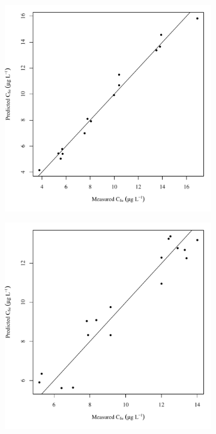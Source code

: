 \begin{linenumbers}
\subfiguretop
\begin{landscape}
	\begin{figure}
		\begin{subfigure}{0.7\textwidth}
			\centering
			\includegraphics[width=\tableCustomSize]{"Figures/Results_USR/Stochastic/Conc Model pred v meas U163"}
		\end{subfigure}%
		\begin{subfigure}{0.7\textwidth}
			\centering
			\includegraphics[width=\tableCustomSize]{"Figures/Results_USR/Stochastic/Conc Model pred v meas U201"}

\end{subfigure}
\end{figure}
\end{landscape}
\end{linenumbers}
